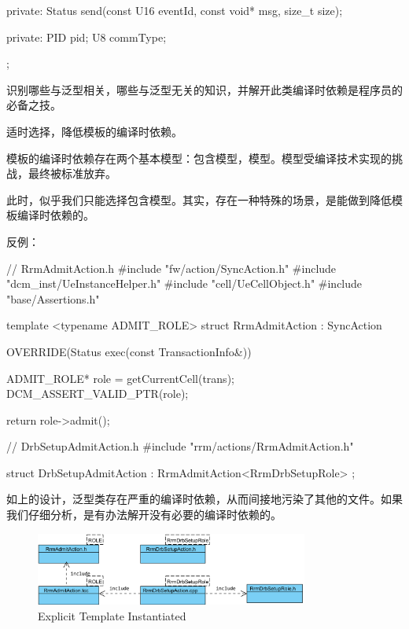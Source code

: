 \begin{content}
\begin{leftbar}
\begin{c++}
{private:
    Status send(const U16 eventId, const void* msg, size_t size);

private:
    PID pid;
    U8 commType;
};
\end{c++}
\end{leftbar}

识别哪些与泛型相关，哪些与泛型无关的知识，并解开此类编译时依赖是\cpp{}程序员的必备之技。

\begin{advise}
适时选择，降低模板的编译时依赖。
\end{advise}

模板的编译时依赖存在两个基本模型：包含模型，模型。模型受编译技术实现的挑战，最终被\cpp{}标准放弃。

此时，似乎我们只能选择包含模型。其实，存在一种特殊的场景，是能做到降低模板编译时依赖的。

反例：
\begin{leftbar}
\begin{c++}
// RrmAdmitAction.h
#include "fw/action/SyncAction.h"
#include "dcm_inst/UeInstanceHelper.h"
#include "cell/UeCellObject.h"
#include "base/Assertions.h"

template <typename ADMIT_ROLE>
struct RrmAdmitAction : SyncAction
{
    OVERRIDE(Status exec(const TransactionInfo&))
    {
        ADMIT_ROLE* role = getCurrentCell(trans);
        DCM_ASSERT_VALID_PTR(role);

        return role->admit(); 
    }
}
\end{c++}
\end{leftbar}

\begin{leftbar}
\begin{c++}
// DrbSetupAdmitAction.h 
#include "rrm/actions/RrmAdmitAction.h"

struct DrbSetupAdmitAction : RrmAdmitAction<RrmDrbSetupRole> {};
\end{c++}
\end{leftbar}

如上的设计，泛型类存在严重的编译时依赖，从而间接地污染了其他的文件。如果我们仔细分析，是有办法解开没有必要的编译时依赖的。

\begin{figure}
  \centering
  \includegraphics[width=0.8\textwidth]{figures/explict-template-inst}
  \caption{Explicit Template Instantiated}
  \label{fig:explict-template-inst}
\end{figure}


\end{content}
